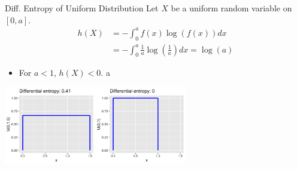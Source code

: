 \documentclass[11pt,compress,t,notes=noshow, xcolor=table]{beamer}
\begin{document}
\begin{vbframe}{Diff. Entropy of Uniform Distribution}
Let $X$ be a uniform random variable on $[0, a]$.
  \begin{equation*}
    \begin{aligned} 
      h(X) &= - \int_0^a f(x) \log(f(x)) dx \\
           &= - \int_0^a \frac{1}{a} \log\left(\frac{1}{a}\right) dx = \log(a) 
    \end{aligned}
  \end{equation*}
  \begin{itemize}
    \item For $a < 1$, $h(X) < 0$. a
    \end{itemize}
    
    \begin{center}
    \includegraphics[width = 8cm ]{figure/uni_entropy.png}
    \end{center}
    
\end{vbframe}
\end{document}
